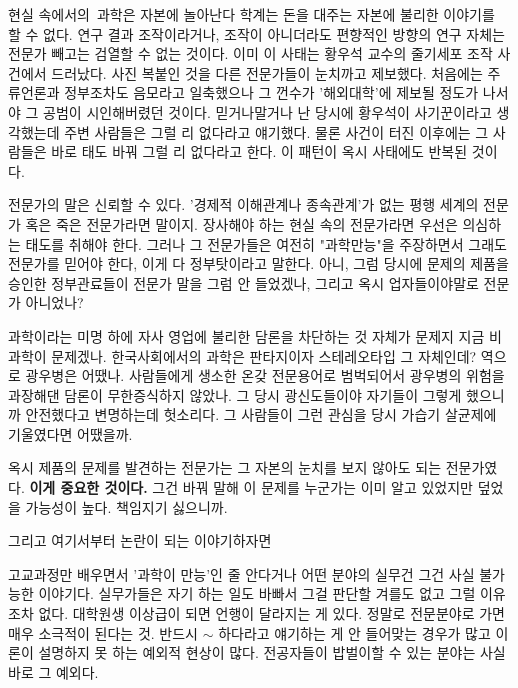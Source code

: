 현실 속에서의 과학은 자본에 놀아난다
학계는 돈을 대주는 자본에 불리한 이야기를 할 수 없다.
연구 결과 조작이라거나, 조작이 아니더라도 편향적인 방향의 연구 자체는 전문가 빼고는 검열할 수 없는 것이다.
이미 이 사태는 황우석 교수의 줄기세포 조작 사건에서 드러났다.
사진 복붙인 것을 다른 전문가들이 눈치까고 제보했다. 처음에는 주류언론과 정부조차도 음모라고 일축했으나
그 껀수가 '해외대학'에 제보될 정도가 나서야 그 공범이 시인해버렸던 것이다.
믿거나말거나 난 당시에 황우석이 사기꾼이라고 생각했는데 주변 사람들은 그럴 리 없다라고 얘기했다.
물론 사건이 터진 이후에는 그 사람들은 바로 태도 바꿔 그럴 리 없다라고 한다.
이 패턴이 옥시 사태에도 반복된 것이다.
\vspace{5mm}

전문가의 말은 신뢰할 수 있다. '경제적 이해관계나 종속관계'가 없는 평행 세계의 전문가 혹은 죽은 전문가라면 말이지.
장사해야 하는 현실 속의 전문가라면 우선은 의심하는 태도를 취해야 한다.
그러나 그 전문가들은 여전히 "과학만능"을 주장하면서 그래도 전문가를 믿어야 한다, 이게 다 정부탓이라고 말한다.
아니, 그럼 당시에 문제의 제품을 승인한 정부관료들이 전문가 말을 그럼 안 들었겠나, 그리고 옥시 업자들이야말로 전문가 아니었나?
\vspace{5mm}

과학이라는 미명 하에 자사 영업에 불리한 담론을 차단하는 것 자체가 문제지 지금 비과학이 문제겠나.
한국사회에서의 과학은 판타지이자 스테레오타입 그 자체인데?
역으로 광우병은 어땠나. 사람들에게 생소한 온갖 전문용어로 범벅되어서 광우병의 위험을 과장해댄 담론이 무한증식하지 않았나.
그 당시 광신도들이야 자기들이 그렇게 했으니까 안전했다고 변명하는데 헛소리다.
그 사람들이 그런 관심을 당시 가습기 살균제에 기울였다면 어땠을까.
\vspace{5mm}

옥시 제품의 문제를 발견하는 전문가는 그 자본의 눈치를 보지 않아도 되는 전문가였다. \textbf{이게 중요한 것이다.}
그건 바꿔 말해 이 문제를 누군가는 이미 알고 있었지만 덮었을 가능성이 높다. 책임지기 싫으니까.
\vspace{5mm}

그리고 여기서부터 논란이 되는 이야기하자면
\vspace{5mm}

고교과정만 배우면서 '과학이 만능'인 줄 안다거나
어떤 분야의 실무건 그건 사실 불가능한 이야기다.
실무가들은 자기 하는 일도 바빠서 그걸 판단할 겨를도 없고 그럴 이유조차 없다.
대학원생 이상급이 되면 언행이 달라지는 게 있다. 정말로 전문분야로 가면 매우 소극적이 된다는 것.
반드시 $\sim$ 하다라고 얘기하는 게 안 들어맞는 경우가 많고 이론이 설명하지 못 하는 예외적 현상이 많다.
전공자들이 밥벌이할 수 있는 분야는 사실 바로 그 예외다.
\vspace{5mm}

